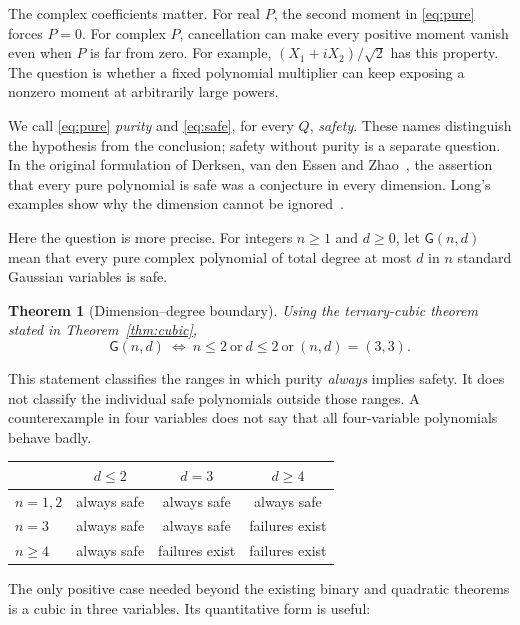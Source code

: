 \documentclass[11pt]{article}
\newtheorem{theorem}{Theorem}[section]
\theoremstyle{definition}\newtheorem{definition}[theorem]{Definition}
\theoremstyle{remark}\newtheorem{remark}[theorem]{Remark}
\newcommand{\G}{\mathsf G}
\begin{document}
The complex coefficients matter. For real $P$, the second moment in
\eqref{eq:pure} forces $P=0$. For complex $P$, cancellation can make
every positive moment vanish even when $P$ is far from zero. For example,
$(X_1+iX_2)/\sqrt2$ has this property. The question is whether a fixed
polynomial multiplier can keep exposing a nonzero moment at arbitrarily
large powers.

We call \eqref{eq:pure} \emph{purity} and \eqref{eq:safe}, for every
$Q$, \emph{safety}. These names distinguish the hypothesis from the
conclusion; safety without purity is a separate question. In the original
formulation of Derksen, van den Essen and Zhao~\cite{DVEZ}, the assertion
that every pure polynomial is safe was a conjecture in every dimension.
Long's examples show why the dimension cannot be ignored~\cite{Long}.

Here the question is more precise. For integers $n\geq1$ and $d\geq0$,
let $\G(n,d)$ mean that every pure complex polynomial of total degree at
most $d$ in $n$ standard Gaussian variables is safe.

\begin{theorem}[Dimension--degree boundary]\label{thm:boundary}
Using the ternary-cubic theorem stated in Theorem~\ref{thm:cubic},
\[
 \boxed{\quad \G(n,d)\ \Longleftrightarrow\
 n\leq2\ \text{or}\ d\leq2\ \text{or}\ (n,d)=(3,3).\quad}
\]
\end{theorem}

This statement classifies the ranges in which purity \emph{always}
implies safety. It does not classify the individual safe polynomials
outside those ranges. A counterexample in four variables does not say
that all four-variable polynomials behave badly.

\begin{center}
\begin{tabular}{@{}lccc@{}}
\toprule
 & $d\leq2$ & $d=3$ & $d\geq4$\\
\midrule
$n=1,2$ & always safe & always safe & always safe\\
$n=3$ & always safe & always safe & failures exist\\
$n\geq4$ & always safe & failures exist & failures exist\\
\bottomrule
\end{tabular}
\end{center}

The only positive case needed beyond the existing binary and quadratic
theorems is a cubic in three variables. Its quantitative form is useful:
\end{document}
